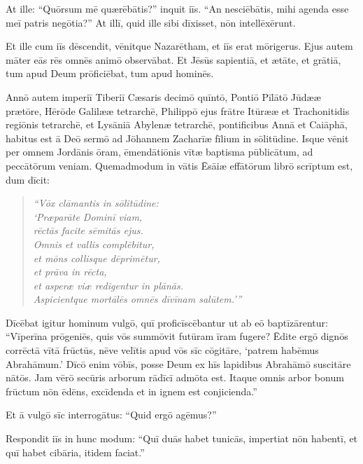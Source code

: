 \Versus At ille: ``Quōrsum mē quærēbātis?'' inquit iīs. ``An nesciēbātis, mihi agenda esse meī patris negōtia?''
\Versus At illī, quid ille sibi dīxisset, nōn intellēxērunt.

\Versus Et ille cum iīs dēscendit, vēnitque Nazarētham, et iīs erat mōrigerus. Ejus autem māter eās rēs omnēs animō observābat.
\Versus Et Jēsūs sapientiā, et ætāte, et grātiā, tum apud Deum prōficiēbat, tum apud hominēs.



\Caput
\Versus Annō autem imperiī Tiberiī Cæsaris decimō quīntō, Pontiō Pīlātō Jūdææ prætōre, Hērōde Galilææ tetrarchē, Philippō ejus frātre Itūrææ et Trachonitidis regiōnis tetrarchē, et Lysāniā Abylenæ tetrarchē,
\Versus pontificibus Annā et Caiāphā, habitus est ā Deō sermō ad Jōhannem Zacharīæ fīlium in sōlitūdine.
\Versus Isque vēnit per omnem Jordānis ōram, ēmendātiōnis vītæ baptisma pūblicātum, ad peccātōrum veniam.
\Versus Quemadmodum in vātis Ēsāiæ effātōrum librō scrīptum est, dum dīcit:

\begin{verse}
\begin{patverse*}
\emph{``Vōx clāmantis in sōlitūdine:\\
`Præparāte Dominī viam,\\
rēctās facite sēmitās ejus.}\\
\Versus \emph{Omnis et vallis complēbitur,\\
et mōns collisque dēprimētur,\\
et prāva in rēcta,\\
et asperæ viæ redigentur in plānās.}\\
\Versus \emph{Aspicientque mortālēs omnēs dīvīnam salūtem.'{}''}
\end{patverse*}
\end{verse}

\Versus Dīcēbat igitur hominum vulgō, quī proficīscēbantur ut ab eō baptīzārentur: ``Vīperīna prōgeniēs, quis vōs summōvit futūram īram fugere?
\Versus Ēdite ergō dignōs corrēctā vītā frūctūs, nēve velītis apud vōs sīc cōgitāre, `patrem habēmus Abrahāmum.' Dīcō enim vōbīs, posse Deum ex hīs lapidibus Abrahāmō suscitāre nātōs.
\Versus Jam vērō secūris arborum rādīcī admōta est. Itaque omnis arbor bonum frūctum nōn ēdēns, excīdenda et in ignem est conjicienda.''

\Versus Et ā vulgō sīc interrogātus: ``Quid ergō agēmus?''

\Versus Respondit iīs in hunc modum: ``Quī duās habet tunicās, impertiat nōn habentī, et quī habet cibāria, itidem faciat.''

